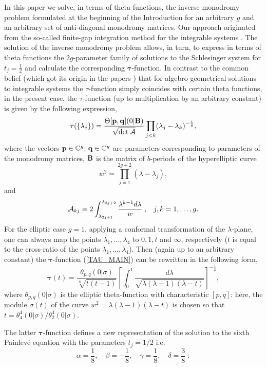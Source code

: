 \documentclass[11pt]{article}
\def\ben{\begin{displaymath}}
\def\een{\end{displaymath}}
\def\l{\lambda}
\def\B{{\bf B}}
\def\C{\mathbb{C}}
\def\f{\frac}
\begin{document}
In this paper we solve, in terms of
theta-functions, the
inverse monodromy problem  formulated at the beginning of the Introduction
for an arbitrary $g$ and an arbitrary
set of  anti-diagonal monodromy matrices. 
Our approach  originated from the so-called finite-gap integration method
for the integrable systems \cite{DMN}.
The solution of the inverse monodromy problem allows, in turn,
to express in terms
of theta functions the
$2g$-parameter family of solutions to the Schlesinger system for $t_j=\f12$ 
and  calculate  
the corresponding $\mathbf{\tau}$-function.
In contrast to the common belief 
(which got its origin in the papers \cite{JM,SMJ,JMU}) 
that for algebro geometrical solutions to integrable systems
the $\tau$-function simply coincides with certain theta functions,
in the present case,
the $\tau$-function (up to multiplication by an arbitrary constant) is given by
the following expression,
\begin{equation}
  \label{TAU_MAIN}
\tau(\{\l_j\})=\f{\Theta[{\bf p},{\bf q}](0|\B)}{\sqrt{\det{\cal A}}}
\prod\limits_{j<k}(\lambda_j-\lambda_k)^{-\frac 18},
\end{equation}
where the vectors ${\bf p}\in \C^g,\,{\bf q}\in\C^g$
are parameters corresponding to parameters of the monodromy matrices, $\B$
is the matrix of $b$-periods of the hyperelliptic curve
\ben
w^2=\prod_{j=1}^{2g+2}(\l-\l_j),
\een
and
\ben
{\cal A}_{kj}\equiv 2\int_{\l_{2j+1}}^{\l_{2j+2}}\f{\l^{k-1} d\l}{w}\;,\;\;\;
j,k=1,\dots,g.
\een
For the elliptic case $g=1$, 
applying a conformal transformation of the $\l$-plane, one can always map the points $\l_1,\dots,\l_4$ to $0,1,t$ and $\infty$, respectively ($t$ is equal to
the cross-ratio of the points $\l_1,\dots,\l_4$). Then (again up to an arbitrary constant) the
 $\mathbf{\tau}$-function (\ref{TAU_MAIN}) can be
rewritten in the following form,
\begin{equation}
  \label{TAU_PAINLEVE_6}
\mathbf{\tau}(t)=\f{\theta_{p,q}(0\vert\sigma)}{\sqrt[8]{t(t-1)}}
\left[\int_0^1\f{d\l}{\sqrt{\l(\l-1)(\l-t)}}\right]^{-\f12},
\end{equation}
where $\theta_{p,q}(0\vert\sigma)$ is the elliptic theta-function with 
characteristic $[p,q]$: here, the module $\sigma(t)$ of the curve
$w^2=\l(\l-1)(\l-t)$ is chosen so that 
$t=\theta_4^4(0|\sigma)/\theta_2^4(0|\sigma)$.

The latter $\mathbf{\tau}$-function defines a new representation
of the  solution
to the sixth Painlev\'e equation with the parameters $t_j=1/2$ i.e.
\begin{equation}
\label{eq:OKAMOTO_COEFFICIENTS}
\alpha=\frac 18,\quad\beta=-\frac 18,\quad
\gamma=\frac 18,\quad\delta=\frac 38\;:  
\end{equation}
\end{document}
